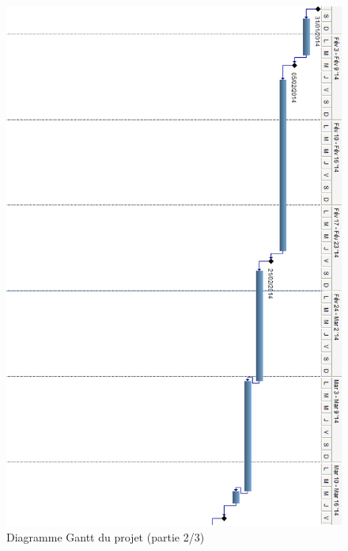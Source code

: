 \documentclass[a4paper, 12pt, twoside]{article}
\begin{document}
\begin{figure}[h]
  \center
  \includegraphics[scale=0.61]{diag_gant2.png}
  \caption{Diagramme Gantt du projet (partie 2/3)}
  \label{diagGant2}
\end{figure}
\end{document}
